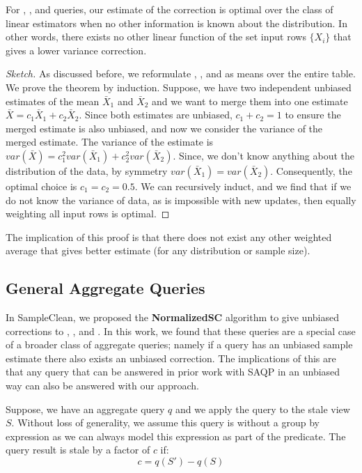 \begin{theorem}
For \sumfunc, \countfunc, and \avgfunc queries, our estimate of the correction is optimal over the class of linear estimators when no other information is known about the distribution. 
In other words, there exists no other linear function of the set input rows $\{ X_i \}$ that gives a lower variance correction.
\end{theorem}
\begin{proof}[Sketch]
As discussed before, we reformulate \sumfunc, \countfunc, and \avgfunc as means over the entire table. We prove the theorem by induction. 
Suppose, we have two independent unbiased estimates of the mean $\bar{X}_1$ and $\bar{X}_2$ and we want to merge them into one estimate $\bar{X} = c_1\bar{X}_1+c_2\bar{X}_2$.
Since both estimates are unbiased, $c_1 + c_2 = 1$ to ensure the merged estimate is also unbiased, and now we consider the variance of the merged estimate.
The variance of the estimate is $var(\bar{X}) = c_1^2var(\bar{X}_1) + c_2^2var(\bar{X}_2)$.
Since, we don't know anything about the distribution of the data, by symmetry $var(\bar{X}_1) = var(\bar{X}_2)$.
Consequently, the optimal choice is $c_1=c_2=0.5$. 
We can recursively induct, and we find that if we do not know the variance of data, as is impossible with new updates, then equally weighting all input rows is optimal. 
\end{proof}
The implication of this proof is that there does not exist any other weighted average that gives better estimate (for any distribution or sample size).

\subsection{General Aggregate Queries}
In SampleClean, we proposed the \textbf{NormalizedSC} algorithm to give unbiased corrections to \sumfunc, \countfunc, and \avgfunc.
In this work, we found that these queries are a special case of a broader class of aggregate queries; namely if a query has an unbiased sample estimate there also exists an unbiased correction.
The implications of this are that any query that can be answered in prior work with SAQP \reminder{[cite?]} in an unbiased way can also be answered with our approach.

Suppose, we have an aggregate query $q$ and we apply the query to the stale view $S$.
Without loss of generality, we assume this query is without a group by expression as we can always model this expression as part of the predicate.
The query result is stale by a factor of $c$ if:
\[ c = q(S') - q(S)\] 

